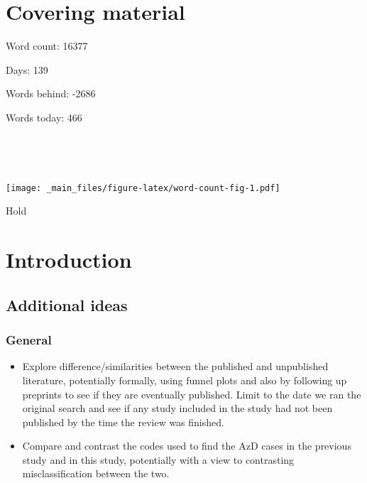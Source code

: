 \documentclass[a4paper, twoside]{templates/ociamthesis}
\begin{document}
\flushbottom

\hypertarget{covering-material}{%
\chapter*{Covering material}\label{covering-material}}

\adjustmtc

Word count: 16377

Days: 139

Words behind: -2686

Words today: 466

~

~

\texttt{[image: \_main\_files/figure-latex/word-count-fig-1.pdf]}

\begin{savequote}
Hold
\end{savequote}



\hypertarget{intro-heading}{%
\chapter{Introduction}\label{intro-heading}}

\minitoc 

\hypertarget{additional-ideas}{%
\section{Additional ideas}\label{additional-ideas}}

\hypertarget{general}{%
\subsection{General}\label{general}}

\begin{itemize}
\item
  Explore difference/similarities between the published and unpublished literature, potentially formally, using funnel plots and also by following up preprints to see if they are eventually published. Limit to the date we ran the original search and see if any study included in the study had not been published by the time the review was finished.
\item
  Compare and contrast the codes used to find the AzD cases in the previous study and in this study, potentially with a view to contrasting misclassification between the two.
\end{itemize}
\end{document}
